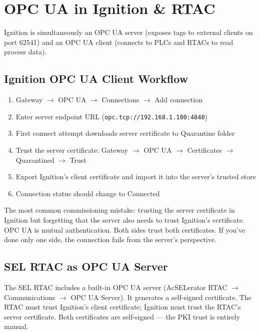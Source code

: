 \documentclass[12pt,twoside,openright]{memoir}
\begin{document}
\chapter{OPC UA in Ignition \& RTAC}

Ignition is simultaneously an OPC UA server (exposes tags to external clients on port 62541) and an OPC UA
client (connects to PLCs and RTACs to read process data).

\section{Ignition OPC UA Client Workflow}

\begin{enumerate}
  \item Gateway $\to$ OPC UA $\to$ Connections $\to$ Add connection
  \item Enter server endpoint URL (\texttt{opc.tcp://192.168.1.100:4840})
  \item First connect attempt downloads server certificate to Quarantine folder
  \item Trust the server certificate: Gateway $\to$ OPC UA $\to$ Certificates $\to$ Quarantined $\to$ Trust
  \item Export Ignition's client certificate and import it into the server's trusted store
  \item Connection status should change to Connected
\end{enumerate}

\begin{fieldgotcha}
The most common commissioning mistake: trusting the server certificate in Ignition but forgetting that the
server also needs to trust Ignition's certificate. OPC UA is mutual authentication. Both sides trust both
certificates. If you've done only one side, the connection fails from the server's perspective.
\end{fieldgotcha}

\section{SEL RTAC as OPC UA Server}

The SEL RTAC includes a built-in OPC UA server (AcSELerator RTAC $\to$ Communications $\to$ OPC UA Server).
It generates a self-signed certificate. The RTAC must trust Ignition's client certificate; Ignition must trust
the RTAC's server certificate. Both certificates are self-signed --- the PKI trust is entirely manual.
\end{document}

